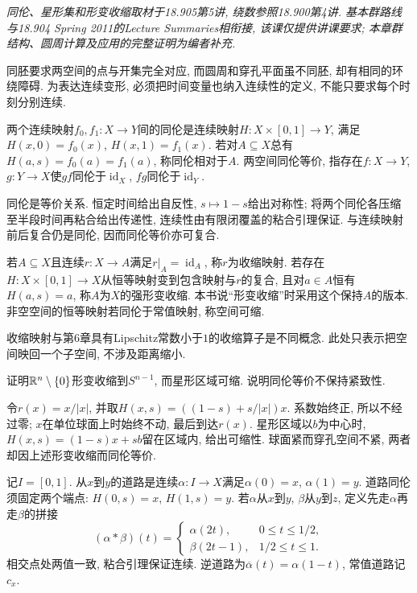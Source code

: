 \label{ch:fundamental}
\emph{同伦、星形集和形变收缩取材于18.905第5讲, 绕数参照18.900第4讲. 基本群路线与18.904 Spring 2011的Lecture Summaries相衔接, 该课仅提供讲课要求; 本章群结构、圆周计算及应用的完整证明为编者补充.}

同胚要求两空间的点与开集完全对应, 而圆周和穿孔平面虽不同胚, 却有相同的环绕障碍. 为表达连续变形, 必须把时间变量也纳入连续性的定义, 不能只要求每个时刻分别连续.
\begin{definition}
两个连续映射$f_0,f_1:X\to Y$间的同伦是连续映射$H:X\times[0,1]\to Y$, 满足$H(x,0)=f_0(x)$, $H(x,1)=f_1(x)$. 若对$A\subseteq X$总有$H(a,s)=f_0(a)=f_1(a)$, 称同伦相对于$A$. 两空间同伦等价, 指存在$f:X\to Y$, $g:Y\to X$使$gf$同伦于$\operatorname{id}_X$, $fg$同伦于$\operatorname{id}_Y$.
\end{definition}
同伦是等价关系. 恒定时间给出自反性, $s\mapsto1-s$给出对称性; 将两个同伦各压缩至半段时间再粘合给出传递性, 连续性由有限闭覆盖的粘合引理保证. 与连续映射前后复合仍是同伦, 因而同伦等价亦可复合.

\begin{definition}
若$A\subseteq X$且连续$r:X\to A$满足$r|_A=\operatorname{id}_A$, 称$r$为收缩映射. 若存在$H:X\times[0,1]\to X$从恒等映射变到包含映射与$r$的复合, 且对$a\in A$恒有$H(a,s)=a$, 称$A$为$X$的强形变收缩. 本书说“形变收缩”时采用这个保持$A$的版本. 非空空间的恒等映射若同伦于常值映射, 称空间可缩.
\end{definition}
收缩映射与第6章具有Lipschitz常数小于$1$的收缩算子是不同概念. 此处只表示把空间映回一个子空间, 不涉及距离缩小.

\begin{example}
证明$\mathbb R^n\setminus\{0\}$形变收缩到$S^{n-1}$, 而星形区域可缩. 说明同伦等价不保持紧致性.
\end{example}
\begin{solution}
令$r(x)=x/|x|$, 并取$H(x,s)=((1-s)+s/|x|)x$. 系数始终正, 所以不经过零; $x$在单位球面上时始终不动, 最后到达$r(x)$. 星形区域以$b$为中心时, $H(x,s)=(1-s)x+sb$留在区域内, 给出可缩性. 球面紧而穿孔空间不紧, 两者却因上述形变收缩而同伦等价.
\end{solution}

记$I=[0,1]$. 从$x$到$y$的道路是连续$\alpha:I\to X$满足$\alpha(0)=x$, $\alpha(1)=y$. 道路同伦须固定两个端点: $H(0,s)=x$, $H(1,s)=y$. 若$\alpha$从$x$到$y$, $\beta$从$y$到$z$, 定义先走$\alpha$再走$\beta$的拼接
\[
 (\alpha*\beta)(t)=
 \begin{cases}\alpha(2t),&0\le t\le1/2,\\ \beta(2t-1),&1/2\le t\le1.
 \end{cases}
\]
相交点处两值一致, 粘合引理保证连续. 逆道路为$\overline\alpha(t)=\alpha(1-t)$, 常值道路记$c_x$.

